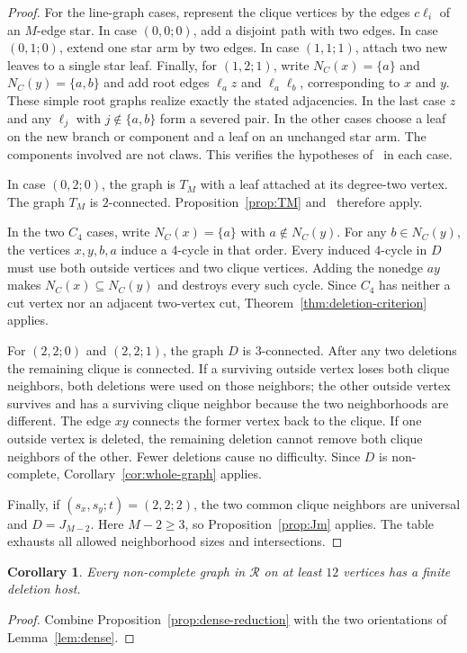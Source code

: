 \documentclass[11pt,reqno]{amsart}
\newtheorem{corollary}[theorem]{Corollary}
\theoremstyle{definition}
\theoremstyle{remark}
\newcommand{\Rclass}{\mathcal{R}}
\begin{document}
\begin{proof}
For the line-graph cases, represent the clique vertices by the edges $c\ell_i$ of an $M$-edge star. In case $(0,0;0)$, add a disjoint path with two edges. In case $(0,1;0)$, extend one star arm by two edges. In case $(1,1;1)$, attach two new leaves to a single star leaf. Finally, for $(1,2;1)$, write $N_C(x)=\{a\}$ and $N_C(y)=\{a,b\}$ and add root edges $\ell_a z$ and $\ell_a\ell_b$, corresponding to $x$ and $y$. These simple root graphs realize exactly the stated adjacencies. In the last case $z$ and any $\ell_j$ with $j\notin\{a,b\}$ form a severed pair. In the other cases choose a leaf on the new branch or component and a leaf on an unchanged star arm. The components involved are not claws. This verifies the hypotheses of~\cite[Theorem~5.2]{FHHS} in each case.

In case $(0,2;0)$, the graph is $T_M$ with a leaf attached at its degree-two vertex. The graph $T_M$ is $2$-connected. Proposition~\ref{prop:TM} and~\cite[Corollary~4.2]{FHHS} therefore apply.

In the two $C_4$ cases, write $N_C(x)=\{a\}$ with $a\notin N_C(y)$. For any $b\in N_C(y)$, the vertices $x,y,b,a$ induce a $4$-cycle in that order. Every induced $4$-cycle in $D$ must use both outside vertices and two clique vertices. Adding the nonedge $ay$ makes $N_C(x)\subseteq N_C(y)$ and destroys every such cycle. Since $C_4$ has neither a cut vertex nor an adjacent two-vertex cut, Theorem~\ref{thm:deletion-criterion} applies.

For $(2,2;0)$ and $(2,2;1)$, the graph $D$ is $3$-connected. After any two deletions the remaining clique is connected. If a surviving outside vertex loses both clique neighbors, both deletions were used on those neighbors; the other outside vertex survives and has a surviving clique neighbor because the two neighborhoods are different. The edge $xy$ connects the former vertex back to the clique. If one outside vertex is deleted, the remaining deletion cannot remove both clique neighbors of the other. Fewer deletions cause no difficulty. Since $D$ is non-complete, Corollary~\ref{cor:whole-graph} applies.

Finally, if $(s_x,s_y;t)=(2,2;2)$, the two common clique neighbors are universal and $D=J_{M-2}$. Here $M-2\ge3$, so Proposition~\ref{prop:Jm} applies. The table exhausts all allowed neighborhood sizes and intersections.
\end{proof}

\begin{corollary}\label{cor:large}
Every non-complete graph in $\Rclass$ on at least $12$ vertices has a finite deletion host.
\end{corollary}
\begin{proof}
Combine Proposition~\ref{prop:dense-reduction} with the two orientations of Lemma~\ref{lem:dense}.
\end{proof}
\end{document}
